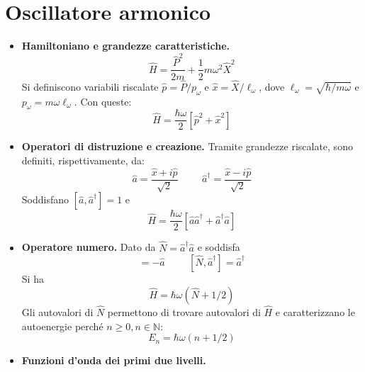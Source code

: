 \documentclass[11pt, a4paper]{scrartcl} %
\numberwithin{equation}{section}
\theoremstyle{style2}
\theoremstyle{style1}
\begin{document}
\section{Oscillatore armonico}
\begin{multicols}{2}
\begin{itemize}
	\item {\sffamily \bfseries Hamiltoniano e grandezze caratteristiche.} 
		\begin{equation}
			\hat{H} = \frac{\hat{P}^2}{2m} + \frac{1}{2}m \omega^2 \hat{X}^2
		\end{equation}
		Si definiscono variabili riscalate $\hat{p} = \hat{P} / p_\omega$ e $\hat{x} = \hat{X} / \ell _\omega$, dove $\ell _\omega = \sqrt{\hbar / m\omega} $ e $p_\omega = m\omega \ell _\omega$.
		Con queste:
		\begin{equation}
			\hat{H} = \frac{\hbar \omega}{2} \left[ \hat{p}^2 + \hat{x}^2 \right] 
		\end{equation}
	\item {\sffamily \bfseries Operatori di distruzione e creazione.} 
Tramite grandezze riscalate, sono definiti, rispettivamente, da:
\begin{equation}
	\hat{a} = \frac{\hat{x}+i \hat{p}}{\sqrt{2} } \hspace{1cm} \hat{a}^\dagger = \frac{\hat{x}-i \hat{p}}{\sqrt{2} }
\end{equation}
Soddisfano $[\hat{a}, \hat{a}^\dagger ] = 1$ e 
\begin{equation}
	\hat{H} = \frac{\hbar \omega}{2} \left[ \hat{a}\hat{a}^\dagger + \hat{a}^\dagger \hat{a} \right] 
\end{equation}
\item {\sffamily \bfseries Operatore numero.} Dato da $\hat{N} = \hat{a}^\dagger \hat{a}$ e soddisfa
	\begin{equation}
		[\hat{N}, \hat{a}] = - \hat{a}\hspace{1cm} [\hat{N}, \hat{a}^\dagger ]= \hat{a}^\dagger 
	\end{equation}
Si ha
\begin{equation}
	\hat{H} = \hbar \omega ( \hat{N} + 1 / 2)
\end{equation}
Gli autovalori di $\hat{N}$ permettono di trovare autovalori di $\hat{H}$ e caratterizzano le autoenergie perch\'e $n\ge 0, n \in \mathbb{N}$:
\begin{equation}
	E_n = \hbar \omega (n + 1 / 2)
\end{equation}
\item {\sffamily \bfseries Funzioni d'onda dei primi due livelli.} 

\end{itemize}
\end{multicols}
\end{document}
